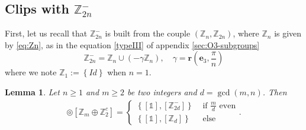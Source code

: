 \documentclass[11pt,a4paper]{amsart}
\newtheorem{lem}[thm]{Lemma}
\theoremstyle{definition}
\newtheorem{rem}[thm]{Remark}
\newcommand{\ZZ}{\mathbb{Z}}                %
\newcommand{\SO}{\mathrm{SO}}               %
\newcommand{\1}{\mathds{1}}		            %
\newcommand{\ee}{\pmb{e}}                   %
\newcommand{\vR}{\mathbf{r}}
\newcommand{\set}[1]{\left\{#1\right\}}     %
\begin{document}

\subsection{Clips with $\ZZ_{2n}^-$}

First, let us recall that $\ZZ_{2n}^-$ is built from the couple $(\ZZ_{n},\ZZ_{2n})$, where $\ZZ_n$ is given by \eqref{eq:Zn}, as in the equation \eqref{typeIII} of appendix \ref{sec:O3-subgroups}
\begin{equation*}
  \ZZ_{2n}^-=\ZZ_{n}\cup (-\gamma\ZZ_n),\quad \gamma=\vR\left(\ee_3,\frac{\pi}{n}\right)
\end{equation*}
where we note $\ZZ_1:=\set{Id}$ when $n=1$.
\begin{lem}\label{lem:clips_Zm}
  Let $n \geq 1$ and $m\geq 2$ be two integers and $d=\gcd(m,n)$. Then
  \begin{align*}
    [\ZZ_{2n}^{-}] \circledcirc [\ZZ_m \oplus \ZZ_2^c]=
    \begin{cases}
      \set{[\1],[\ZZ_{2d}^-]} & \text{ if  $\frac{m}{d}$ even} \\
      \set{[\1],[\ZZ_d]}      & \text{ else}
    \end{cases}
    .
  \end{align*}
\end{lem}
\end{document}

